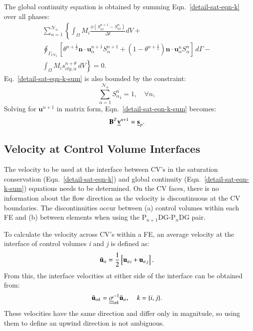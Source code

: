 \documentclass[preprint,authoryear,12pt]{elsarticle}
\begin{document}
The global continuity equation is obtained by summing
Eqn.~\ref{detail-sat-eqn-k} over all phases:
\begin{eqnarray}
  \sum\limits_{\alpha=1}^{\mathcal{N}_{\alpha}} \left\lbrace
  \int_{\Omega} M_{i} \displaystyle\frac{\phi\left({S_{\alpha
        i}^{n+1}}-{S_{\alpha i}^{n}}\right) } {\Delta t} dV +
  \right. \nonumber \\ \left. \displaystyle\oint_{{\Gamma_{CV}}_{i}}
  \left[\theta^{n+\frac{1}{2}} {\mathbf n} \cdot {\mathbf
      u}_{\alpha}^{n+1} S_{\alpha}^{n+1} +
    \left(1-\theta^{n+\frac{1}{2}}\right) {\mathbf n} \cdot {\mathbf
      u}_{\alpha}^{n} S_{\alpha}^{n} \right] \,d\Gamma -
  \right. \nonumber \\ \left. \displaystyle\int_{\Omega} M_{i}
  s_{cty,\alpha}^{n+\theta}\, dV \right\rbrace = 0.
           \label{detail-sat-eqn-k-sum}
\end{eqnarray}
Eq.~\ref{detail-sat-eqn-k-sum} is also bounded by the constraint:
\begin{equation}
  \sum\limits_{\alpha=1}^{\mathcal{N}_{\alpha}} {S_{\alpha}^{n}}_{i} =
  1, \quad \forall n,
\end{equation}
Solving for ${\mathbf u}^{n+1}$ in matrix form,
Eqn.~\ref{detail-sat-eqn-k-sum} becomes:
\begin{equation}
  {\mathbf B}^T \underline{\bf v}^{n+1} = \underline{\bf s}_{p}.
  \label{glob-cty-matrix}
\end{equation}


\subsection{Velocity at Control Volume Interfaces} \label{opt-up} 
The velocity to be used at the interface between CV's in the
saturation conservation (Eqn.~\ref{detail-sat-eqn-k}) and global
continuity (Eqn.~\ref{detail-sat-eqn-k-sum}) equations needs to be
determined. On the CV faces, there is no information about the flow
direction as the velocity is discontinuous at the CV boundaries. The
discontinuities occur between (a) control volumes within each FE and
(b) between elements when using the P$_{n+1}$DG-P$_{n}$DG pair.

To calculate the velocity across CV's within a FE, an average velocity
at the interface of control volumes {\it i} and {\it j} is defined as:
\begin{equation}
  {\tilde{\bf u}}_\alpha = \frac{1}{2} \left[ {{\bf u}_\alpha}_i +
    {{\bf u}_\alpha}_j \right].
\end{equation} 
From this, the interface velocities at either side of the interface
can be obtained from:
\begin{equation}
  {\tilde{\bf u}}_{\alpha k} = \underline{\underline{\sigma}}_{\alpha
    k}^{-1}{\tilde{{\bf u}}}_{\alpha}, \;\;\;\; k=\{i,j\}.
  \label{two-vels}
\end{equation} 
These velocities have the same direction and 
differ only in magnitude, so using them to define an upwind
direction is not ambiguous.
\end{document}
